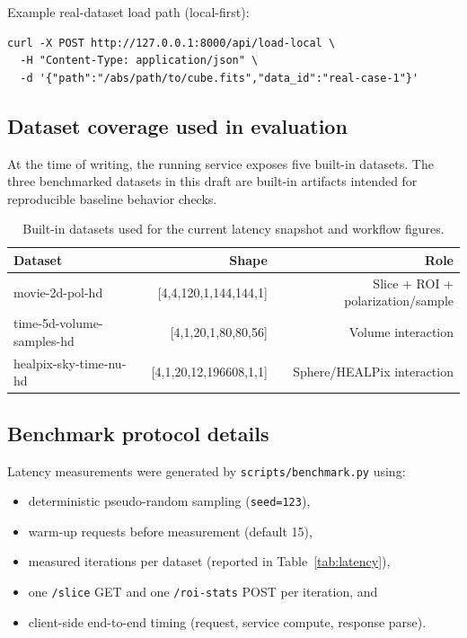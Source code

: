 \documentclass[11pt]{article}
\begin{document}
Example real-dataset load path (local-first):
\begin{verbatim}
curl -X POST http://127.0.0.1:8000/api/load-local \
  -H "Content-Type: application/json" \
  -d '{"path":"/abs/path/to/cube.fits","data_id":"real-case-1"}'
\end{verbatim}

\subsection{Dataset coverage used in evaluation}
At the time of writing, the running service exposes five built-in datasets. The three benchmarked datasets in this draft are built-in artifacts intended for reproducible baseline behavior checks.

\begin{table}[t]
  \centering
  \small
  \begin{tabular}{lrr}
    \toprule
    Dataset & Shape & Role \\
    \midrule
    movie-2d-pol-hd & [4,4,120,1,144,144,1] & Slice + ROI + polarization/sample \\
    time-5d-volume-samples-hd & [4,1,20,1,80,80,56] & Volume interaction \\
    healpix-sky-time-nu-hd & [4,1,20,12,196608,1,1] & Sphere/HEALPix interaction \\
    \bottomrule
  \end{tabular}
  \caption{Built-in datasets used for the current latency snapshot and workflow figures.}
  \label{tab:datasets}
\end{table}

\subsection{Benchmark protocol details}
Latency measurements were generated by \texttt{scripts/benchmark.py} using:
\begin{itemize}[leftmargin=1.5em]
  \item deterministic pseudo-random sampling (\texttt{seed=123}),
  \item warm-up requests before measurement (default 15),
  \item measured iterations per dataset (reported in Table~\ref{tab:latency}),
  \item one \texttt{/slice} GET and one \texttt{/roi-stats} POST per iteration, and
  \item client-side end-to-end timing (request, service compute, response parse).
\end{itemize}
\end{document}
